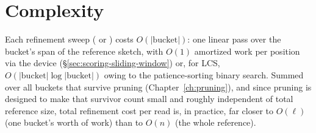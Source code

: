 \section{Complexity}

Each refinement sweep ( or ) costs $O(|\mathrm{bucket}|)$: one
linear pass over the bucket's span of the reference sketch, with $O(1)$ amortized work per
position via the  device (\S\ref{sec:scoring-sliding-window}) or, for LCS,
$O(|\mathrm{bucket}|\log|\mathrm{bucket}|)$ owing to the patience-sorting binary search. Summed
over all buckets that survive pruning (Chapter~\ref{ch:pruning}), and since pruning is designed
to make that survivor count small and roughly independent of total reference size, total
refinement cost per read is, in practice, far closer to $O(\ell)$ (one bucket's worth of work)
than to $O(n)$ (the whole reference).
